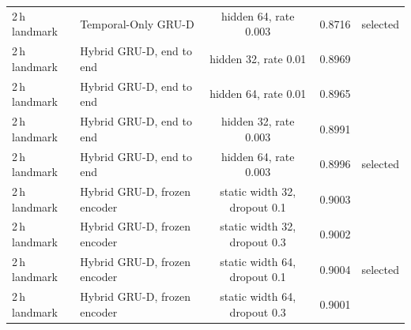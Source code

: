 \begin{table}[t]
\begin{tabular}{llccc}
2\,h landmark & Temporal-Only GRU-D & hidden 64, rate 0.003 & 0.8716 & selected \\
2\,h landmark & Hybrid GRU-D, end to end & hidden 32, rate 0.01 & 0.8969 &  \\
2\,h landmark & Hybrid GRU-D, end to end & hidden 64, rate 0.01 & 0.8965 &  \\
2\,h landmark & Hybrid GRU-D, end to end & hidden 32, rate 0.003 & 0.8991 &  \\
2\,h landmark & Hybrid GRU-D, end to end & hidden 64, rate 0.003 & 0.8996 & selected \\
2\,h landmark & Hybrid GRU-D, frozen encoder & static width 32, dropout 0.1 & 0.9003 &  \\
2\,h landmark & Hybrid GRU-D, frozen encoder & static width 32, dropout 0.3 & 0.9002 &  \\
2\,h landmark & Hybrid GRU-D, frozen encoder & static width 64, dropout 0.1 & 0.9004 & selected \\
2\,h landmark & Hybrid GRU-D, frozen encoder & static width 64, dropout 0.3 & 0.9001 &  \\
\bottomrule
\end{tabular}
\end{table}
